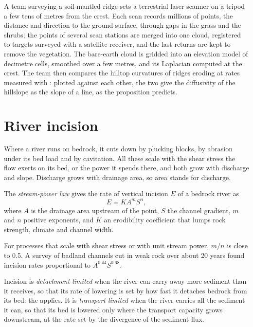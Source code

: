 \begin{inthefield}
A team surveying a soil-mantled ridge sets a terrestrial laser scanner on a
tripod a few tens of metres from the crest. Each scan records millions of
points, the distance and direction to the ground surface, through gaps in
the grass and the shrubs; the points of several scan stations are merged
into one cloud, registered to targets surveyed with a satellite receiver,
and the last returns are kept to remove the vegetation. The bare-earth cloud
is gridded into an elevation model of decimetre cells, smoothed over a few
metres, and its Laplacian computed at the crest. The team then compares the
hilltop curvatures of ridges eroding at rates measured with : plotted against each other, the two give the diffusivity of the
hillslope as the slope of a line, as the proposition predicts.
\end{inthefield}

\section{River incision}\label{sec:b3:quantitative-geomorphology:rivers}

Where a river runs on bedrock, it cuts down by plucking blocks, by abrasion
under its bed load and by cavitation. All these scale with the shear stress
the flow exerts on its bed, or the power it spends there, and both grow
with discharge and slope. Discharge grows with drainage area, so area stands
for discharge.

\begin{definition}\label{def:b3:quantitative-geomorphology:stream-power}
The \emph{stream-power law} gives the rate of
vertical incision $E$ of a bedrock river as
\[
E = K A^m S^n ,
\]
where $A$ is the drainage area upstream of the point, $S$ the channel
gradient, $m$ and $n$ positive exponents, and $K$ an erodibility
coefficient that lumps rock strength, climate and channel width.
\end{definition}

For processes that scale with shear stress or with unit stream power,
$m/n$ is close to 0.5. A survey of badland channels cut in weak rock over
about 20 years found incision rates proportional to $A^{0.44}S^{0.68}$.

\begin{definition}\label{def:b3:quantitative-geomorphology:limited}
Incision is \emph{detachment-limited}
when the river can carry away more sediment than it receives, so that its
rate of lowering is set by how fast it detaches bedrock from its bed: the
 applies. It is
\emph{transport-limited} when the river
carries all the sediment it can, so that its bed is lowered only where the
transport capacity grows downstream, at the rate set by the divergence of
the sediment flux.
\end{definition}

